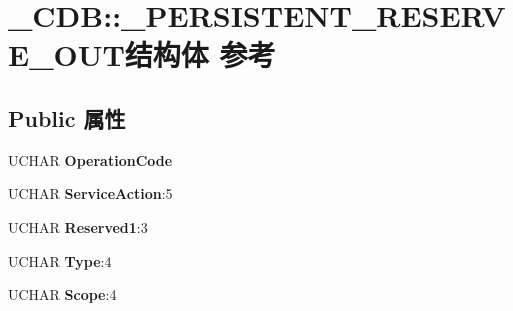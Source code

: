 \hypertarget{struct___c_d_b_1_1___p_e_r_s_i_s_t_e_n_t___r_e_s_e_r_v_e___o_u_t}{}\section{\+\_\+\+C\+DB\+:\+:\+\_\+\+P\+E\+R\+S\+I\+S\+T\+E\+N\+T\+\_\+\+R\+E\+S\+E\+R\+V\+E\+\_\+\+O\+U\+T结构体 参考}
\label{struct___c_d_b_1_1___p_e_r_s_i_s_t_e_n_t___r_e_s_e_r_v_e___o_u_t}
\subsection*{Public 属性}
\begin{DoxyCompactItemize}
\item 
\mbox{\label{struct___c_d_b_1_1___p_e_r_s_i_s_t_e_n_t___r_e_s_e_r_v_e___o_u_t_a3774cf4f31e7845dfed0ade18805bed7}} 
U\+C\+H\+AR {\bfseries Operation\+Code}
\item 
\mbox{\label{struct___c_d_b_1_1___p_e_r_s_i_s_t_e_n_t___r_e_s_e_r_v_e___o_u_t_a449d5fe6298c283d4c7c22175d3416f9}} 
U\+C\+H\+AR {\bfseries Service\+Action}\+:5
\item 
\mbox{\label{struct___c_d_b_1_1___p_e_r_s_i_s_t_e_n_t___r_e_s_e_r_v_e___o_u_t_adec845875d30f7b00eed76826e70c19c}} 
U\+C\+H\+AR {\bfseries Reserved1}\+:3
\item 
\mbox{\label{struct___c_d_b_1_1___p_e_r_s_i_s_t_e_n_t___r_e_s_e_r_v_e___o_u_t_a00da53b2d4e150dd645e186ff0408735}} 
U\+C\+H\+AR {\bfseries Type}\+:4
\item 
\mbox{\label{struct___c_d_b_1_1___p_e_r_s_i_s_t_e_n_t___r_e_s_e_r_v_e___o_u_t_a67fc2ae902942ac9c0238b43a698b859}} 
U\+C\+H\+AR {\bfseries Scope}\+:4
\item 
\mbox{\label{struct___c_d_b_1_1___p_e_r_s_i_s_t_e_n_t___r_e_s_e_r_v_e___o_u_t_a2949b68b2bdbc748e908c0dce57b4588}} 

\end{DoxyCompactItemize}
